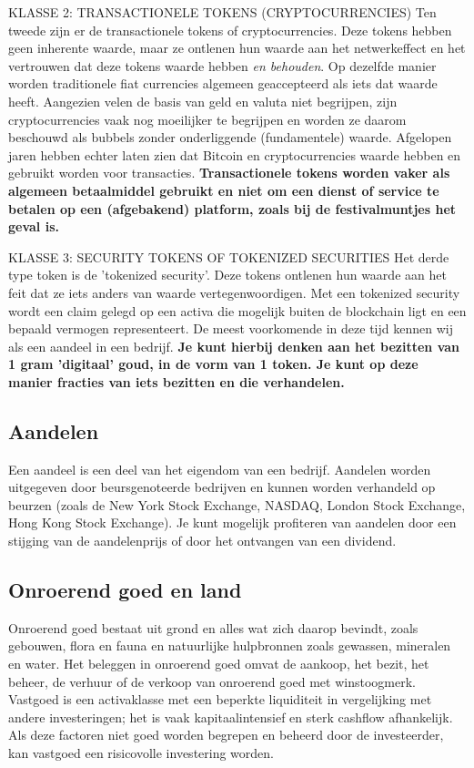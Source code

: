     \medskip
    \begin{cryptobox}{KLASSE 2: TRANSACTIONELE TOKENS (CRYPTOCURRENCIES)}
        Ten tweede zijn er de transactionele tokens of cryptocurrencies. Deze tokens hebben geen inherente waarde, maar ze ontlenen hun waarde aan het netwerkeffect en het vertrouwen dat deze tokens waarde hebben \emph{en behouden}.
        Op dezelfde manier worden traditionele fiat currencies algemeen geaccepteerd als iets dat waarde heeft. Aangezien velen de basis van geld en valuta niet begrijpen, zijn cryptocurrencies vaak nog moeilijker te begrijpen en worden ze daarom beschouwd als bubbels zonder onderliggende (fundamentele) waarde. Afgelopen jaren hebben echter laten zien dat Bitcoin en cryptocurrencies waarde hebben en gebruikt worden voor transacties.
        \tcblower
        \textbf{Transactionele tokens worden vaker als algemeen betaalmiddel gebruikt en niet om een dienst of service te betalen op een (afgebakend) platform, zoals bij de festivalmuntjes het geval is.}
    \end{cryptobox}

    \medskip
    \begin{cryptobox}{KLASSE 3: SECURITY TOKENS OF TOKENIZED SECURITIES}
            Het derde type token is de 'tokenized security'. Deze tokens ontlenen hun waarde aan het feit dat ze iets anders van waarde vertegenwoordigen. Met een tokenized security wordt een claim gelegd op een activa die mogelijk buiten de blockchain ligt en een bepaald vermogen representeert. De meest voorkomende in deze tijd kennen wij als een aandeel in een bedrijf. 
            \tcblower
            \textbf{Je kunt hierbij denken aan het bezitten van 1 gram 'digitaal' goud, in de vorm van 1 token. Je kunt op deze manier fracties van iets bezitten en die verhandelen.}
    \end{cryptobox}

\subsection{Aandelen}
Een aandeel is een deel van het eigendom van een bedrijf. Aandelen worden uitgegeven door beursgenoteerde bedrijven en kunnen worden verhandeld op beurzen (zoals de New York Stock Exchange, NASDAQ, London Stock Exchange, Hong Kong Stock Exchange). Je kunt mogelijk profiteren van aandelen door een stijging van de aandelenprijs of door het ontvangen van een dividend.

\subsection{Onroerend goed en land}
Onroerend goed bestaat uit grond en alles wat zich daarop bevindt, zoals gebouwen, flora en fauna en natuurlijke hulpbronnen zoals gewassen, mineralen en water. Het beleggen in onroerend goed omvat de aankoop, het bezit, het beheer, de verhuur of de verkoop van onroerend goed met winstoogmerk. Vastgoed is een activaklasse met een beperkte liquiditeit in vergelijking met andere investeringen; het is vaak kapitaalintensief en sterk cashflow afhankelijk. Als deze factoren niet goed worden begrepen en beheerd door de investeerder, kan vastgoed een risicovolle investering worden.

